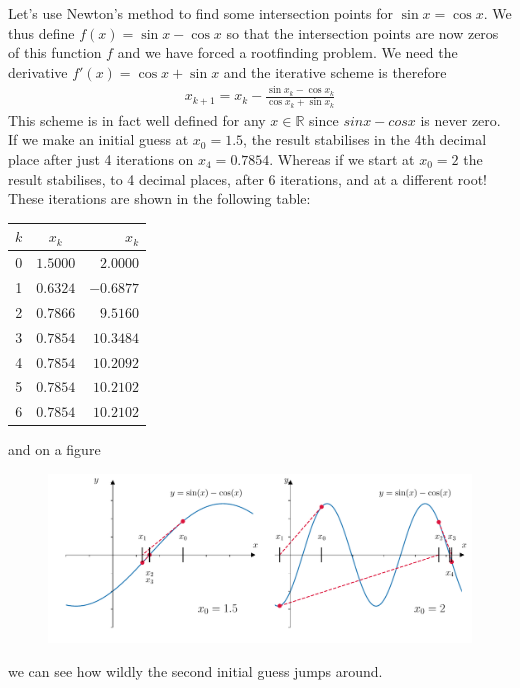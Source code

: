 \exemple{\upline}
	{	
	Let's use Newton's method to find some intersection points for $\sin x = \cos x$. We thus define $f(x) = \sin x - \cos x$ so that the intersection points are now zeros of this function $f$ and we have forced a rootfinding problem. We need the derivative $f'(x) = \cos x + \sin x$ and the iterative scheme is therefore
	\begin{align*}
	x_{k+1} = x_k - \frac{\sin x_k - \cos x_k}{\cos x_k + \sin x_k}
	\end{align*}
	This scheme is in fact well defined for any $x\in\mathbb{R}$ since $sin x - cos x$ is never zero. If we make an initial guess at $x_0=1.5$, the result stabilises in the 4th decimal place after just 4 iterations on $x_4 = 0.7854$. Whereas if we start at $x_0=2$ the result stabilises, to 4 decimal places, after 6 iterations, and at a different root! These iterations are shown in the following table:	
	\begin{table}[H]
	\begin{center}
	\begin{tabular}{ccr}
	$k$  &  $x_k$  &  $x_k$ \\ \hline
	0  &  $1.5000$  &  $2.0000$ \\
	1  &  $0.6324$  &  $-0.6877$  \\
	2  &  $0.7866$  &  $9.5160$  \\
	3  &  $0.7854$  &  $10.3484$  \\
	4  &  $0.7854$  &  $10.2092$   \\
	5  &  $0.7854$  &  $10.2102$   \\
	6  &  $0.7854$  &  $10.2102$ 
	\end{tabular}
	\end{center}
	\end{table}
	and on a figure 
	\begin{figure}[H]
	\begin{center}
	\includegraphics[width=\linewidth]{figures/ch2_newton4.pdf}  \label{fig:ch2_newton4}
	\end{center}
	\end{figure}
	we can see how wildly the second initial guess jumps around.
	}
{\downline}


